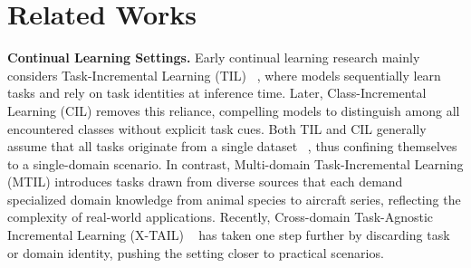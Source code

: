 \documentclass{article}
\theoremstyle{plain}
\theoremstyle{definition}
\theoremstyle{remark}
\begin{document}
\section{Related Works}

\textbf{Continual Learning Settings.} Early continual learning research mainly considers Task-Incremental Learning (TIL) ~\cite{hsu2018re}, where models sequentially learn tasks and rely on task identities at inference time. Later, Class-Incremental Learning (CIL) \cite{rebuffi2017icarl} removes this reliance, compelling models to distinguish among all encountered classes without explicit task cues. Both TIL and CIL generally assume that all tasks originate from a single dataset ~\cite{yan2021dynamically, zhu2021prototype, douillard2022dytox}, thus confining themselves to a single-domain scenario. In contrast, Multi-domain Task-Incremental Learning (MTIL) \cite{zheng2023preventing} introduces tasks drawn from diverse sources that each demand specialized domain knowledge from animal species to aircraft series, reflecting the complexity of real-world applications. Recently, Cross-domain Task-Agnostic Incremental Learning (X-TAIL) ~\cite{xu2024advancing} has taken one step further by discarding task or domain identity, pushing the setting closer to practical scenarios.
\end{document}
